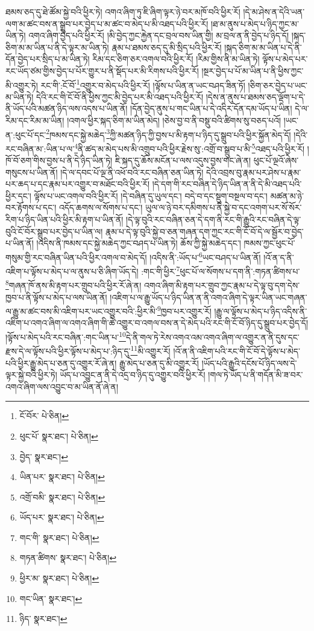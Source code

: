 ཐམས་ཅད་དུ་ཐེ་ཚོམ་སྐྱེ་བའི་ཕྱིར་ཏེ། འགའ་ཞིག་ཏུ་ཇི་ཞིག་ལྟར་ཉེ་བར་མཁོ་བའི་ཕྱིར་རོ། །དེ་མ་ཤེས་ན་དེའི་ཡན་ལག་མ་ཚང་བས་ན་སྒྲུབ་པར་བྱེད་པ་མ་ཚང་བ་མེད་པ་མི་འཐད་པའི་ཕྱིར་རོ། །ཐ་མ་ནུས་པ་མེད་པ་ཉིད་ཀྱང་མ་ཡིན་ཏེ། འགའ་ཞིག་བྱེད་པའི་ཕྱིར་རོ། །མི་བྱེད་ཀྱང་རྐྱེན་དང་བྲལ་བས་ཡིན་གྱི། མ་བྲལ་ན་ནི་བྱེད་པ་ཉིད་དོ། །སྐད་ཅིག་མ་མ་ཡིན་པ་ནི་དེ་ལྟར་མ་ཡིན་ཏེ། རྣམ་པ་ཐམས་ཅད་དུ་མི་སྲིད་པའི་ཕྱིར་རོ། །སྐད་ཅིག་མ་མ་ཡིན་པ་དེ་ནི་དོན་བྱེད་པར་སྲིད་པ་མ་ཡིན་ཏེ། རིམ་དང་ཅིག་ཅར་འགལ་བའི་ཕྱིར་རོ། །རིམ་གྱིས་ནི་མ་ཡིན་ཏེ། ལྟོས་པ་མེད་པར་རང་ཡོད་ཙམ་གྱིས་བྱེད་པ་པོར་གྱུར་པ་ནི་སྡོད་པར་མི་རིགས་པའི་ཕྱིར་རོ། །སྔར་བྱེད་པ་པོ་མ་ཡིན་པ་ནི་ཕྱིས་ཀྱང་མི་འགྱུར་ཏེ། རང་གི་:ངོ་བོ་\footnote{ངོ་བོར་  པེ་ཅིན། }འགྱུར་བ་མེད་པའི་ཕྱིར་རོ། །ལྟོས་པ་ཡིན་ན་ཡང་བཤད་ཟིན་ཏོ། །ཅིག་ཅར་བྱེད་པ་ཡང་མ་ཡིན་ཏེ། དེའི་རང་གི་ངོ་བོ་ནི་ཕྱིས་ཀྱང་མི་བྱེད་པར་མི་འཐད་པའི་ཕྱིར་རོ། །དེས་ན་ནུས་པ་ཐམས་ཅད་ལྡོག་པ་དེ་ནི་ཡོད་པའི་མཚན་ཉིད་ལས་འདས་པ་ཡིན་ནོ། །དོན་བྱེད་ནུས་པ་གང་ཡིན་པ་དེ་འདིར་དོན་དམ་ཡོད་པ་ཡིན། དེ་ལ་རིམ་དང་རིམ་མ་ཡིན། །འགལ་ཕྱིར་སྐད་ཅིག་མ་ཡིན་མེད། །ཅེས་བྱ་བ་ནི་བསྡུ་བའི་ཚིགས་སུ་བཅད་པའོ། །ཡང་ན་:ཕུང་པོ་དང་\footnote{ཕུང་པོ་  སྣར་ཐང་།  པེ་ཅིན། }ཁམས་དང་སྐྱེ་མཆེད་\footnote{བྱེད་  སྣར་ཐང་། }ཀྱི་མཚན་ཉིད་ཀྱི་བྱས་པ་མི་རྟག་པ་ཉིད་དུ་སྒྲུབ་པའི་ཕྱིར་སྐྱོན་མེད་དོ། །དེའི་རང་བཞིན་མ་:ཡིན་པ་ལ་\footnote{ཡིན་པར་  སྣར་ཐང་།  པེ་ཅིན། }ནི་ཚད་མ་མེད་པས་མི་འགྲུབ་པའི་ཕྱིར་རྗེས་སུ་:འགྲོ་བ་སྒྲུབ་པ་མི་\footnote{འགྲོ་བམི་  སྣར་ཐང་།  པེ་ཅིན། }འཐད་པའི་ཕྱིར་རོ། །ཁོ་བོ་ཅག་གིས་བྱས་པ་ནི་དེ་ཉིད་ཡིན་ཏེ། ཇི་སྐད་དུ་ཆོས་མངོན་པ་ལས་འདུས་བྱས་གང་ཞེ་ན། ཕུང་པོ་ལྔའོ་ཞེས་གསུངས་པ་ཡིན་ནོ། །དེ་ལ་དབང་པོ་ལྔ་ནི་འཕོ་བའི་རང་བཞིན་ཅན་ཡིན་ཏེ། དེའི་འབྲས་བུ་རྣམ་པར་ཤེས་པ་རྣམ་པར་ཆད་པ་དང་རྣམ་པར་འགྱུར་བ་མཐོང་བའི་ཕྱིར་རོ། །དེ་དག་གི་རང་བཞིན་དེ་ཉིད་ཡིན་ན་ནི་དེ་མི་འཐད་པའི་ཕྱིར་དང་། ལྟོས་པ་ཡང་འགལ་བའི་ཕྱིར་རོ། །དེ་བཞིན་དུ་ཡུལ་དང་། བདེ་བ་དང་སྡུག་བསྔལ་བ་དང་། མཚན་མ་ཉེ་བར་རྟོགས་པ་དང་། འདོད་ཆགས་ལ་སོགས་པ་དང་། ཡུལ་ལ་ཉེ་བར་དམིགས་པ་ནི་སྐྱེ་བ་དང་འགག་པར་སོ་སོར་རིག་པ་ཉིད་ཡིན་པའི་ཕྱིར་མི་རྟག་པ་ཡིན་ནོ། །དེ་ལྟ་བུའི་རང་བཞིན་ཅན་དེ་དག་ནི་རང་གི་རྒྱུའི་རང་བཞིན་དེ་ལྟ་བུའི་ངོ་བོར་སྒྲུབ་པར་བྱེད་པ་ཡིན་ལ། རྣམ་པ་དེ་ལྟ་བུའི་སྐྱེ་བ་ཅན་གཞན་དག་ཀྱང་རང་གི་ངོ་བོ་དེ་ལ་སྦྱོར་བ་བྱེད་པ་ཡིན་ནོ། །འདིས་ནི་ཁམས་དང་སྐྱེ་མཆེད་ཀྱང་བཤད་པ་ཡིན་ཏེ། ཆོས་ཀྱི་སྐྱེ་མཆེད་དང་། ཁམས་ཀྱང་ཕུང་པོ་གསུམ་གྱི་རང་བཞིན་ཡིན་པའི་ཕྱིར་འགལ་བ་མེད་དོ། །འདིས་ནི་:ཡོད་པ་\footnote{ཡོད་པར་  སྣར་ཐང་།  པེ་ཅིན། }ཡང་བཤད་པ་ཡིན་ནོ། །འོ་ན་ད་ནི་འཇིག་པ་ལྟོས་པ་མེད་པ་ལ་ནུས་པ་ཅི་ཞིག་ཡོད་དེ། :གང་གི་ཕྱིར་\footnote{གང་གི་  སྣར་ཐང་།  པེ་ཅིན། }ཕུང་པོ་ལ་སོགས་པ་དག་ནི་:གཏན་ཚིགས་པ་\footnote{གཏན་ཚིགས་  སྣར་ཐང་།  པེ་ཅིན། }གཞན་ཁོ་ནས་མི་རྟག་པར་གྲུབ་པའི་ཕྱིར་རོ་ཞེ་ན། འགའ་ཞིག་མི་རྟག་པར་གྲུབ་ཀྱང་རྣམ་པ་དེ་ལྟ་བུ་དག་དེས་ཁྱབ་པ་ནི་ལྟོས་པ་མེད་པ་ལས་ཡིན་ནོ། །འཇིག་པ་ལ་རྒྱུ་ཡོད་པ་ཉིད་ཡིན་ན་ནི་འགའ་ཞིག་དེ་ལྟར་ཡིན་ཡང་གཞན་ལ་རྒྱུ་མ་ཚང་བས་མི་འཇིག་པར་ཡང་འགྱུར་བའི་:ཕྱིར་མི་\footnote{ཕྱིར་མ་  སྣར་ཐང་།  པེ་ཅིན། }ཁྱབ་པར་འགྱུར་རོ། །རྒྱུ་ལ་ལྟོས་པ་མེད་པ་ཉིད་འདིས་ནི་འཇིག་པ་འགའ་ཞིག་ལ་འགའ་ཞིག་གི་ཚེ་འགྱུར་བ་འགལ་བས་ན་དེ་མེད་པའི་རང་གི་ངོ་བོ་ཉིད་དུ་སྒྲུབ་པར་བྱེད་དོ། །ལྟོས་པ་མེད་པའི་རང་བཞིན་:གང་ཡིན་པ་\footnote{གང་ཡིན་  སྣར་ཐང་། }དེ་ནི་གལ་ཏེ་རེས་འགའ་འམ་འགའ་ཞིག་ལ་འགྱུར་ན་ནི་དུས་དང་རྫས་དེ་ལ་ལྟོས་པའི་ཕྱིར་ལྟོས་པ་མེད་པ་:ཉིད་དུ་\footnote{ཉིད་  སྣར་ཐང་། }མི་འགྱུར་རོ། །འོ་ན་ནི་འཇིག་པའི་རང་གི་ངོ་བོ་དེ་ལྟོས་པ་མེད་པའི་ཕྱིར་རྒྱུ་མེད་པ་ཅན་དུ་འགྱུར་རོ་ཞེ་ན། རྒྱུ་མེད་པ་ཅན་དུ་མི་འགྱུར་རོ། །ཡོད་པའི་རྒྱུའི་དངོས་པོ་ཉིད་ལས་དེ་ལྟར་སྐྱེ་བའི་ཕྱིར་ཏེ། ཡོད་པ་འབྱུང་ན་ནི་དེ་འདྲ་བ་ཉིད་དུ་འགྱུར་བའི་ཕྱིར་རོ། །གལ་ཏེ་ཡོད་པ་ནི་གདོན་མི་ཟ་བར་འགའ་ཞིག་ལས་འབྱུང་བ་མ་ཡིན་ནོ་ཞེ་ན། 